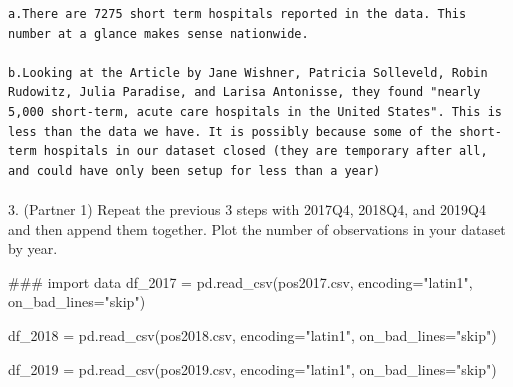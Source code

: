 \documentclass[
  letterpaper,
  DIV=11,
  numbers=noendperiod]{scrartcl}
\makeatletter
\let\oldparagraph\paragraph
\renewcommand{\paragraph}{
    \@ifstar
      \xxxParagraphStar
      \xxxParagraphNoStar
  }
\newcommand{\xxxParagraphStar}[1]{\oldparagraph*{#1}\mbox{}}
\newcommand{\xxxParagraphNoStar}[1]{\oldparagraph{#1}\mbox{}}
\newenvironment{Shaded}{\begin{snugshade}}{\end{snugshade}}
\newcommand{\CommentTok}[1]{\textcolor[rgb]{0.37,0.37,0.37}{#1}}
\newcommand{\NormalTok}[1]{\textcolor[rgb]{0.00,0.23,0.31}{#1}}
\newcommand{\OperatorTok}[1]{\textcolor[rgb]{0.37,0.37,0.37}{#1}}
\newcommand{\StringTok}[1]{\textcolor[rgb]{0.13,0.47,0.30}{#1}}
\makeatother
\begin{document}
\begin{verbatim}
a.There are 7275 short term hospitals reported in the data. This number at a glance makes sense nationwide.

b.Looking at the Article by Jane Wishner, Patricia Solleveld, Robin Rudowitz, Julia Paradise, and Larisa Antonisse, they found "nearly 5,000 short-term, acute care hospitals in the United States". This is less than the data we have. It is possibly because some of the short-term hospitals in our dataset closed (they are temporary after all, and could have only been setup for less than a year)
\end{verbatim}

\paragraph{3. (Partner 1) Repeat the previous 3 steps with 2017Q4,
2018Q4, and 2019Q4 and then append them together. Plot the number of
observations in your dataset by
year.}\label{partner-1-repeat-the-previous-3-steps-with-2017q4-2018q4-and-2019q4-and-then-append-them-together.-plot-the-number-of-observations-in-your-dataset-by-year.}

\begin{Shaded}
\begin{Highlighting}[]
\CommentTok{\#\#\# import data }
\NormalTok{df\_2017 }\OperatorTok{=}\NormalTok{ pd.read\_csv(}\StringTok{\textquotesingle{}pos2017.csv\textquotesingle{}}\NormalTok{, encoding}\OperatorTok{=}\StringTok{"latin1"}\NormalTok{, on\_bad\_lines}\OperatorTok{=}\StringTok{"skip"}\NormalTok{)}

\NormalTok{df\_2018 }\OperatorTok{=}\NormalTok{ pd.read\_csv(}\StringTok{\textquotesingle{}pos2018.csv\textquotesingle{}}\NormalTok{, encoding}\OperatorTok{=}\StringTok{"latin1"}\NormalTok{, on\_bad\_lines}\OperatorTok{=}\StringTok{"skip"}\NormalTok{)}

\NormalTok{df\_2019 }\OperatorTok{=}\NormalTok{ pd.read\_csv(}\StringTok{\textquotesingle{}pos2019.csv\textquotesingle{}}\NormalTok{, encoding}\OperatorTok{=}\StringTok{"latin1"}\NormalTok{, on\_bad\_lines}\OperatorTok{=}\StringTok{"skip"}\NormalTok{)}
\end{Highlighting}
\end{Shaded}
\end{document}
